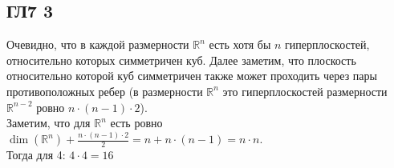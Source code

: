 \subsection*{ГЛ7 3}
Очевидно, что в каждой размерности $\mathbb{R}^{n}$ есть хотя бы $n$ гиперплоскостей, относительно которых симметричен куб. Далее заметим, что плоскость относительно которой куб симметричен также может проходить через пары противоположных ребер (в размерности $\mathbb{R}^{n}$ это гиперплоскостей размерности $\mathbb{R}^{n-2}$ ровно $n \cdot (n-1) \cdot 2$).\\
Заметим, что для $\mathbb{R}^n$ есть ровно $\dim(\mathbb{R}^n) + \frac{n \cdot (n-1) \cdot 2}{2} = n + n \cdot (n-1) = n \cdot n$.\\
Тогда для 4: $4 \cdot 4 = 16$ 
		